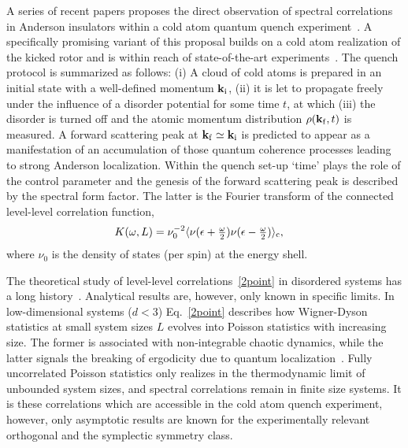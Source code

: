 \documentclass[twocolumn,showpacs,aps,prl]{revtex4}
\begin{document}
A series of recent papers proposes the direct observation of spectral correlations in 
Anderson insulators 
within a cold atom quantum quench experiment~\cite{fwd1,fwd2,fwd3,fwd4}.  
A specifically promising variant of this proposal builds on a cold atom realization of the kicked rotor
and is within reach of state-of-the-art experiments~\cite{fwd5}.
The quench protocol is summarized as follows:  
(i) A cloud of cold atoms is prepared in an initial state with a well-defined momentum
$\bold{k}_{\rm i}$, (ii) it is let to propagate freely 
under the influence of a disorder potential for some time $t$, at which
(iii) the disorder is turned off and the atomic momentum distribution 
$\rho(\bold{k}_{\rm f},t)$ is measured. 
A forward scattering peak at $\bold{k}_{\rm f}\simeq \bold{k}_{\rm i}$ is predicted to appear 
as a manifestation of an  
accumulation of those quantum coherence processes 
leading to strong Anderson localization. 
Within the quench set-up `time' plays the role of the control parameter and
the genesis of the forward scattering peak is described by the spectral form factor. 
The latter is the
Fourier transform of the connected level-level correlation function, 
\begin{align}
\label{2point}
K(\omega,L)
&=
\nu_0^{-2}
\langle \nu(\epsilon+\tfrac{\omega}{2})\nu(\epsilon-\tfrac{\omega}{2})\rangle_{\rm c},
\end{align}
where $\nu_0$ is the density of states (per spin) at the energy shell. 

The theoretical study of level-level correlations~\eqref{2point} 
in disordered systems has a 
long history~\cite{Gor'kovEliashberg,Efetov82,EfetovAdv,AltshulerShlovskii1,AltshulerShlovskii2,SivanImry,Zharekeshev,Izrailev,Shlovskii,Evangelou}. 
Analytical results are, however, only known in specific limits.  
In low-dimensional systems ($d<3$) Eq.~\eqref{2point}  
describes how Wigner-Dyson statistics at small system sizes 
$L$ evolves into Poisson 
statistics with increasing size.  
The former is associated with non-integrable chaotic dynamics, 
while the latter signals the breaking of ergodicity due to quantum localization~\cite{Porter,Haake}.
Fully uncorrelated Poisson statistics 
only realizes in the thermodynamic  
limit of unbounded system sizes, and spectral correlations 
remain 
 in finite size systems. 
It is these correlations which are accessible in the cold atom quench experiment, however,  
only asymptotic results are known for the experimentally relevant orthogonal and 
the symplectic symmetry class.
\end{document}

